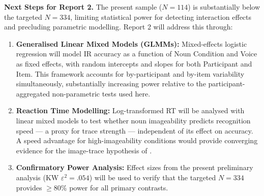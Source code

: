 \documentclass[12pt, a4paper]{article}
\begin{document}
\textbf{Next Steps for Report 2.} The present sample ($N = 114$) is
substantially below the targeted $N = 334$, limiting statistical power for
detecting interaction effects and precluding parametric modelling. Report 2
will address this through:
\begin{enumerate}
    \item \textbf{Generalised Linear Mixed Models (GLMMs):} Mixed-effects
    logistic regression will model IR accuracy as a function of Noun Condition
    and Voice as fixed effects, with random intercepts and slopes for both
    Participant and Item. This framework accounts for by-participant and
    by-item variability simultaneously, substantially increasing power
    relative to the participant-aggregated non-parametric tests used here.
    \item \textbf{Reaction Time Modelling:} Log-transformed RT will be analysed
    with linear mixed models to test whether noun imageability predicts
    recognition speed — a proxy for trace strength — independent of its effect
    on accuracy. A speed advantage for high-imageability conditions would provide
    converging evidence for the image-trace hypothesis of \citet{begg1971}.
    \item \textbf{Confirmatory Power Analysis:} Effect sizes from the present
    preliminary analysis (KW $\varepsilon^2 = .054$) will be used to verify
    that the targeted $N = 334$ provides $\geq 80\%$ power for all primary
    contrasts.
\end{enumerate}



\end{document}
